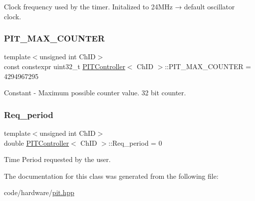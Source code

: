 Clock frequency used by the timer. Initalized to 24\+M\+Hz → default oscillator clock. 

\mbox{\label{classPITController_a53778fe7e47ac9741bef0bc190e0646a}} 
\subsubsection{\texorpdfstring{P\+I\+T\+\_\+\+M\+A\+X\+\_\+\+C\+O\+U\+N\+T\+ER}{PIT\_MAX\_COUNTER}}
{\footnotesize\ttfamily template$<$unsigned int Ch\+ID$>$ \\
const constexpr uint32\+\_\+t \hyperlink{classPITController}{P\+I\+T\+Controller}$<$ Ch\+ID $>$\+::P\+I\+T\+\_\+\+M\+A\+X\+\_\+\+C\+O\+U\+N\+T\+ER = 4294967295\hspace{0.3cm}{\ttfamily [static]}}



Constant -\/ Maximum possible counter value. 32 bit counter. 

\mbox{\label{classPITController_a9de0af49a52145c8d2a8f4e90a519b60}} 
\subsubsection{\texorpdfstring{Req\+\_\+period}{Req\_period}}
{\footnotesize\ttfamily template$<$unsigned int Ch\+ID$>$ \\
double \hyperlink{classPITController}{P\+I\+T\+Controller}$<$ Ch\+ID $>$\+::Req\+\_\+period = 0}



Time Period requested by the user. 



The documentation for this class was generated from the following file\+:\begin{DoxyCompactItemize}
\item 
code/hardware/\hyperlink{pit_8hpp}{pit.\+hpp}\end{DoxyCompactItemize}
